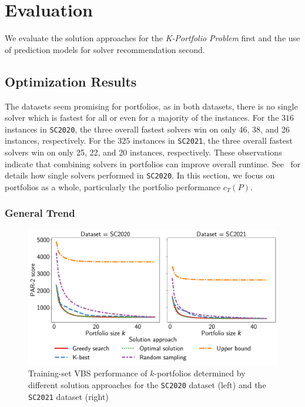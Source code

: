 \documentclass[a4paper,USenglish,pdfa]{lipics-v2021} %
\begin{document}
\section{Evaluation}
\label{sec:evaluation}

We evaluate the solution approaches for the \emph{K-Portfolio Problem} first and the use of prediction models for solver recommendation second.

\subsection{Optimization Results}

The datasets seem promising for portfolios, as in both datasets, there is no single solver which is fastest for all or even for a majority of the instances.
For the $316$ instances in \texttt{SC2020}, the three overall fastest solvers win on only 46, 38, and 26 instances, respectively.
For the $325$ instances in \texttt{SC2021}, the three overall fastest solvers win on only 25, 22, and 20 instances, respectively.
These observations indicate that combining solvers in portfolios can improve overall runtime.
See~\cite{SC2020:AIJ} for details how single solvers performed in \texttt{SC2020}.
In this section, we focus on portfolios as a whole, particularly the portfolio performance $c_T(P)$.

\subsubsection{General Trend}

\begin{figure}[htb]
	\centering
	\includegraphics[width=\columnwidth]{plots/search-train-objective.pdf}
	\caption{Training-set VBS performance of $k$-portfolios determined by different solution approaches for the \texttt{SC2020} dataset (left) and the \texttt{SC2021} dataset (right)}
	\label{fig:search-train-objective}
\end{figure}
\end{document}
